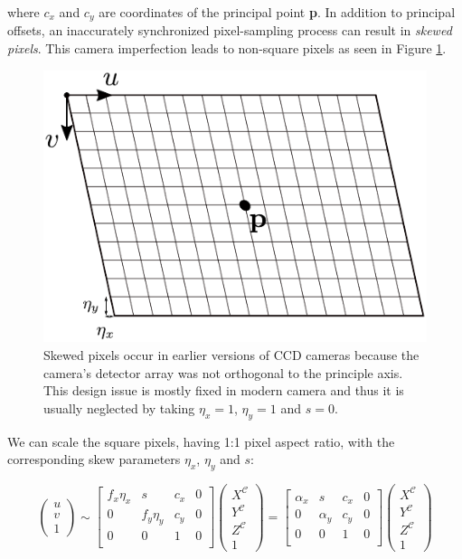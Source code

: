 \documentclass[a4paper]{report}
\numberwithin{figure}{section}
\begin{document}
where $c_x$ and $c_y$ are coordinates of the principal point \textbf{p}.
In addition to principal offsets, an inaccurately synchronized pixel-sampling 
process can result in \textit{skewed pixels}. This camera imperfection leads 
to non-square pixels as seen in Figure \ref{fig:skewed}.

\begin{figure}[H]
	\centering
  \includegraphics[width=0.4\linewidth,natwidth=640,natheight=640]
  {fig/drawings/pinhole_skew.pdf}
  \caption[Skewed Pixels]{Skewed pixels occur in earlier versions of CCD 
  cameras because the camera's detector array was not orthogonal to the 
  principle axis. This design issue is mostly fixed in modern camera and thus 
  it is usually neglected by taking $\eta_x=1$, $\eta_y=1$ and $s=0$.}
	\label{fig:skewed}
\end{figure}

We can scale the square pixels, having 1:1 pixel aspect ratio, with the 
corresponding skew parameters $\eta_x$, $\eta_y$ and $s$:

\begin{equation} \label{eq:proj_func_w_square_pix_skew}
  \begin{pmatrix}
    u\\
    v\\
    1
  \end{pmatrix}
  \sim
  \begin{bmatrix}
    f_x\eta_x & s & c_x & 0\\
    0 & f_y\eta_y & c_y & 0\\
    0 & 0 & 1 & 0\\
  \end{bmatrix}
  \begin{pmatrix}
    X^{\mathcal{C}}\\
    Y^{\mathcal{C}}\\
    Z^{\mathcal{C}}\\
    1
  \end{pmatrix}
  =
  \begin{bmatrix}
    \alpha_x & s & c_x & 0\\
    0 & \alpha_y & c_y & 0\\
    0 & 0 & 1 & 0\\
  \end{bmatrix}
  \begin{pmatrix}
    X^{\mathcal{C}}\\
    Y^{\mathcal{C}}\\
    Z^{\mathcal{C}}\\
    1
  \end{pmatrix}
\end{equation} 
\end{document}

